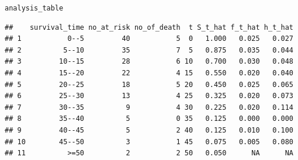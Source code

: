 \documentclass[11pt, a4paper]{article}\usepackage[]{graphicx}\usepackage[]{xcolor}
\makeatletter
\newcommand{\hldef}[1]{\textcolor[rgb]{0.345,0.345,0.345}{#1}}%
\newenvironment{kframe}{%
 \def\at@end@of@kframe{}%
 \ifinner\ifhmode%
  \def\at@end@of@kframe{\end{minipage}}%
  \begin{minipage}{\columnwidth}%
 \fi\fi%
 \def\FrameCommand##1{\hskip\@totalleftmargin \hskip-\fboxsep
 \colorbox{shadecolor}{##1}\hskip-\fboxsep
     \hskip-\linewidth \hskip-\@totalleftmargin \hskip\columnwidth}%
 \MakeFramed {\advance\hsize-\width
   \@totalleftmargin\z@ \linewidth\hsize
   \@setminipage}}%
 {\par\unskip\endMakeFramed%
 \at@end@of@kframe}
\newenvironment{knitrout}{}{} %
\makeatother
\begin{document}
\begin{knitrout}
\color{fgcolor}\begin{kframe}
\begin{alltt}
\hldef{analysis_table}
\end{alltt}
\begin{verbatim}
##    survival_time no_at_risk no_of_death  t S_t_hat f_t_hat h_t_hat
## 1           0--5         40           5  0   1.000   0.025   0.027
## 2          5--10         35           7  5   0.875   0.035   0.044
## 3         10--15         28           6 10   0.700   0.030   0.048
## 4         15--20         22           4 15   0.550   0.020   0.040
## 5         20--25         18           5 20   0.450   0.025   0.065
## 6         25--30         13           4 25   0.325   0.020   0.073
## 7         30--35          9           4 30   0.225   0.020   0.114
## 8         35--40          5           0 35   0.125   0.000   0.000
## 9         40--45          5           2 40   0.125   0.010   0.100
## 10        45--50          3           1 45   0.075   0.005   0.080
## 11          >=50          2           2 50   0.050      NA      NA
\end{verbatim}
\end{kframe}
\end{knitrout}



\newpage
\end{document}
